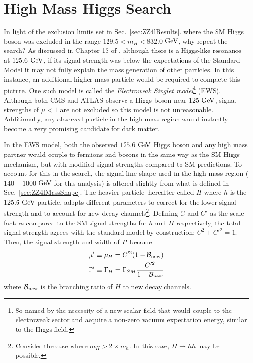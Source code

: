 \section{High Mass Higgs Search}
\label{sec:HighMass}

In light of the exclusion limits set in Sec.~\ref{sec:ZZ4lResults}, where the SM Higgs boson was excluded in the range $129.5<m_H<832.0$ $\rm{GeV}$, why repeat the search? As discussed in Chapter 13 of \cite{HXSWG_Properties}, although there is a Higgs-like resonance at $125.6$ $\rm{GeV}$, if its signal strength was below the expectations of the Standard Model it may not fully explain the mass generation of other particles. In this instance, an additional higher mass particle would be required to complete this picture. One such model is called the \textit{Electroweak Singlet model}\footnote{So named by the necessity of a new scalar field that would couple to the electroweak sector and acquire a non-zero vacuum expectation energy, similar to the Higgs field.} (EWS). Although both CMS and ATLAS observe a Higgs boson near $125$ $\rm{GeV}$, signal strengths of $\mu<1$ are not excluded so this model is not unreasonable. Additionally, any observed particle in the high mass region would instantly become a very promising candidate for dark matter.

In the EWS model, both the observed $125.6$ $\rm{GeV}$ Higgs boson and any high mass partner would couple to fermions and bosons in the same way as the SM Higgs mechanism, but with modified signal strengths compared to SM predictions. To account for this in the search, the signal line shape used in the high mass region ($140-1000$ $\rm{GeV}$ for this analysis) is altered slightly from what is defined in Sec.~\ref{sec:ZZ4lMassShape}. The heavier particle, hereafter called $H$ where $h$ is the $125.6$ $\rm{GeV}$ particle, adopts different parameters to correct for the lower signal strength and to account for new decay channels\footnote{Consider the case where $m_{H} > 2\times m_{h}$. In this case, $H\rightarrow hh$ may be possible.}. Defining $C$ and $C'$ as the scale factors compared to the SM signal strengths for $h$ and $H$ respectively, the total signal strength agrees with the standard model by construction: $C^2 + C'^2 = 1$. Then, the signal strength and width of $H$ become
\begin{align}
\mu' &\equiv \mu_{H} = C'^2 (1-\mathcal{B}_{\rm{new}}) \\
\Gamma' &\equiv \Gamma_{H} = \Gamma_{SM}\frac{C'^2}{1-\mathcal{B}_{\rm{new}}}
\end{align} 
where $\mathcal{B}_{\rm{new}}$ is the branching ratio of $H$ to new decay channels.

